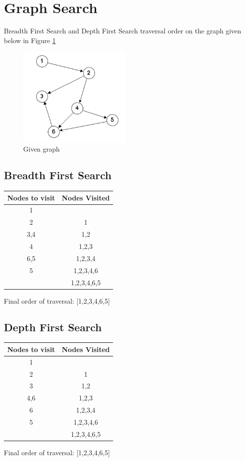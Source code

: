 \documentclass{article}
\begin{document}
\section{Graph Search}
Breadth First Search and Depth First Search traversal order on the graph given below in Figure \ref{fig:graph}
\begin{figure}[H]
    \centering
    \includegraphics[width=0.5\textwidth]{images02/graph.png}
    \caption{Given graph}
    \label{fig:graph}
\end{figure}

\subsection{Breadth First Search}
\begin{center}
\begin{tabular}{ | c | c | } 
 \hline
 Nodes to visit & Nodes Visited \\
 \hline
 1 &  \\
 2 & 1 \\
 3,4 & 1,2 \\
 4 & 1,2,3 \\
 6,5 & 1,2,3,4 \\
 5 & 1,2,3,4,6 \\
  & 1,2,3,4,6,5 \\
 \hline
\end{tabular}
\end{center}
\begin{center}
Final order of traversal: [1,2,3,4,6,5]
\end{center}

\subsection{Depth First Search}
\begin{center}
\begin{tabular}{ | c | c | } 
 \hline
 Nodes to visit & Nodes Visited \\
 \hline
 1 &  \\
 2 & 1 \\
 3 & 1,2 \\
 4,6 & 1,2,3 \\
 6 & 1,2,3,4 \\
 5 & 1,2,3,4,6 \\
  & 1,2,3,4,6,5 \\
 \hline
\end{tabular}
\end{center}
\begin{center}
Final order of traversal: [1,2,3,4,6,5]
\end{center}
\end{document}
